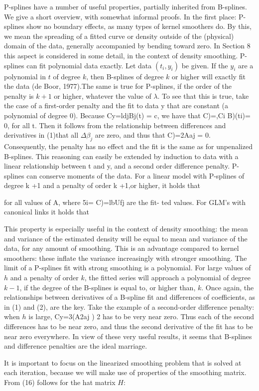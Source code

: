 \documentclass[12pt]{article}
\newcommand*\needsparaphrased{\color{red}}
\begin{document}
{\needsparaphrased P-splines have a number of useful properties, partially inherited from B-splines. We give a short overview, with somewhat informal proofs. In the first place: P-splines show no boundary effects, as many types of kernel smoothers do. By this, we mean the spreading of a fitted curve or density outside of the (physical) domain of the data, generally accompanied by bending toward zero. In Section 8 this aspect is considered in some detail, in the context of density smoothing. P-splines can fit polynomial data exactly. Let data $\left(t_i,y_i\right)$ be given. If the $y_i$ are a polynomial in $t$ of degree $k$, then B-splines of degree $k$ or higher will exactly fit the data (de Boor, 1977).The same is true for P-splines, if the order of the penalty is $k +1$ or higher, whatever the value of $\lambda$. To see that this is true, take the case of a first-order penalty and the fit to data y that are constant (a polynomial of degree 0). Because Cy=ldjBj(t) = c, we have that C)=,Ci B)(ti)= 0, for all t. Then it follows from the relationship between differences and derivatives in (1)that all $\Delta \beta_j$ are zero, and thus that C)=2Aaj = 0. Consequently, the penalty has no effect and the fit is the same as for unpenalized B-splines. This reasoning can easily be extended by induction to data with a linear relationship between t and y, and a second order difference penalty.
P-splines can conserve moments of the data. For a linear model with P-splines of degree k +1 and a penalty of order k +1,or higher, it holds that }

{\needsparaphrased  for all values of A, where 5i= C)=lbUfj are the fit- ted values. For GLM's with canonical links it holds that }

{\needsparaphrased This property is especially useful in the context of density smoothing: the mean and variance of the estimated density will be equal to mean and variance of the data, for any amount of smoothing. This is an advantage compared to kernel smoothers: these inflate the variance increasingly with stronger smoothing. The limit of a P-splines fit with strong smoothing is a polynomial. For large values of $h$ and a penalty of order $k$, the fitted series will approach a polynomial of degree $k-1$, if the degree of the B-splines is equal to, or higher than, $k$. Once again, the relationships between derivatives of a B-spline fit and differences of coefficients, as in (1) and (2), are the key. Take the example of a second-order difference penalty: when $h$ is large, Cy=3(A2aj ) 2 has to be very near zero. Thus each of the second differences has to be near zero, and thus the second derivative of the fit has to be near zero everywhere. In view of these very useful results, it seems that B-splines and difference penalties are the ideal marriage.

It is important to focus on the linearized smoothing problem that is solved at each iteration, because we will make use of properties of the smoothing matrix. From (16) follows for the hat matrix $H$:}
\end{document}
